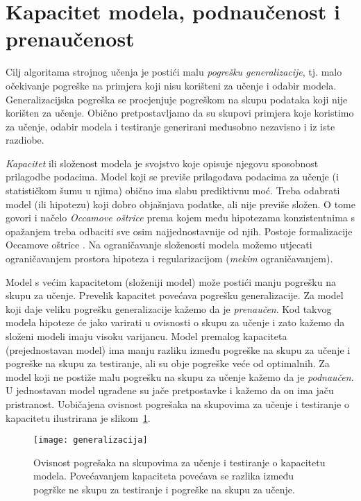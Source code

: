 \documentclass[utf8, diplomski, lmodern]{fer}
\begin{document}
\section{Kapacitet modela, podnaučenost i prenaučenost}

Cilj algoritama strojnog učenja je postići malu \emph{pogrešku generalizacije}, tj. malo očekivanje pogreške na primjera koji nisu korišteni za učenje i odabir modela. Generalizacijska pogreška se procjenjuje pogreškom na skupu podataka koji nije korišten za učenje. Obično pretpostavljamo da su skupovi primjera koje koristimo za učenje, odabir modela i testiranje generirani međusobno nezavisno i iz iste razdiobe.

\emph{Kapacitet} ili složenost modela je svojstvo koje opisuje njegovu sposobnost prilagodbe podacima. Model koji se previše prilagođava podacima za učenje (i statističkom šumu u njima) obično ima slabu prediktivnu moć. Treba odabrati model (ili hipotezu) koji dobro objašnjava podatke, ali nije previše složen. O tome govori i načelo \emph{Occamove oštrice} prema kojem među hipotezama konzistentnima s opažanjem treba odbaciti sve osim najjednostavnije od njih. Postoje formalizacije Occamove oštrice \citep{Blumer:1987:OR,Blumer:1989:LVCD,Gruenwald:2005:TIMDL,Ratmanner:2011:PTUI}. Na ograničavanje složenosti modela možemo utjecati ograničavanjem prostora hipoteza i regularizacijom (\textit{mekim} ograničavanjem).

Model s većim kapacitetom (složeniji model) može postići manju pogrešku na skupu za učenje. Prevelik kapacitet povećava pogrešku generalizacije. Za model koji daje veliku pogrešku generalizacije kažemo da je \emph{prenaučen}. Kod takvog modela hipoteze će jako varirati u ovisnosti o skupu za učenje i zato kažemo da složeni modeli imaju visoku varijancu. Model premalog kapaciteta (prejednostavan model) ima manju razliku između pogreške na skupu za učenje i pogreške na skupu za testiranje, ali su obje pogreške veće od optimalnih. Za model koji ne postiže malu pogrešku na skupu za učenje kažemo da je \emph{podnaučen}. U jednostavan model ugrađene su jače pretpostavke i kažemo da on ima jaču pristranost. Uobičajena ovisnost pogrešaka na skupovima za učenje i testiranje o kapacitetu ilustrirana je slikom~\ref{fig:generalizacija}.

\begin{figure}
	\centering
	\texttt{[image: generalizacija]}
	\caption{Ovisnost pogrešaka na skupovima za učenje i testiranje o kapacitetu modela. Povećavanjem kapaciteta povećava se razlika između pogrške ne skupu za testiranje i pogreške na skupu za učenje.}
	\label{fig:generalizacija}
\end{figure}
\end{document}
